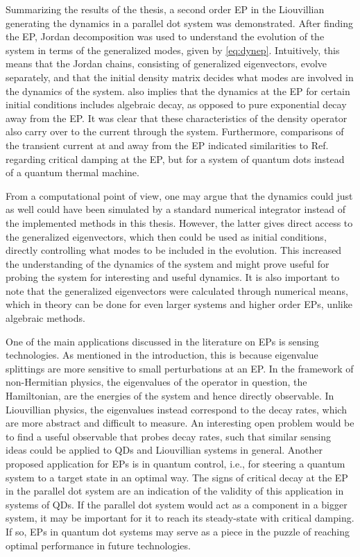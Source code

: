 \documentclass[../main.tex]{subfiles}
\begin{document}
Summarizing the results of the thesis, a second order EP in the Liouvillian generating the dynamics in a parallel dot system was demonstrated. After finding the EP, Jordan decomposition was used to understand the evolution of the system in terms of the generalized modes, given by \cref{eq:dynep}. Intuitively, this means that the Jordan chains, consisting of generalized eigenvectors, evolve separately, and that the initial density matrix decides what modes are involved in the dynamics of the system.  also implies that the dynamics at the EP for certain initial conditions includes algebraic decay, as opposed to pure exponential decay away from the EP. It was clear that these characteristics of the density operator also carry over to the current through the system. Furthermore, comparisons of the transient current at and away from the EP indicated similarities to Ref.~\cite{thermal} regarding critical damping at the EP, but for a system of quantum dots instead of a quantum thermal machine.

From a computational point of view, one may argue that the dynamics could just as well could have been simulated by a standard numerical integrator instead of the implemented methods in this thesis. However, the latter gives direct access to the generalized eigenvectors, which then could be used as initial conditions, directly controlling what modes to be included in the evolution. This increased the understanding of the dynamics of the system and might prove useful for probing the system for interesting and useful dynamics. It is also important to note that the generalized eigenvectors were calculated through numerical means, which in theory can be done for even larger systems and higher order EPs, unlike algebraic methods. %

One of the main applications discussed in the literature on EPs is sensing technologies. As mentioned in the introduction, this is because eigenvalue splittings are more sensitive to small perturbations at an EP. In the framework of non-Hermitian physics, the eigenvalues of the operator in question, the Hamiltonian, are the energies of the system and hence directly observable. In Liouvillian physics, the eigenvalues instead correspond to the decay rates, which are more abstract and difficult to measure. An interesting open problem would be to find a useful observable that probes decay rates, such that similar sensing ideas could be applied to QDs and Liouvillian systems in general. Another proposed application for EPs is in quantum control, i.e., for steering a quantum system to a target state in an optimal way. The signs of critical decay at the EP in the parallel dot system are an indication of the validity of this application in systems of QDs. If the parallel dot system would act as a component in a bigger system, it may be important for it to reach its steady-state with critical damping. If so, EPs in quantum dot systems may serve as a piece in the puzzle of reaching optimal performance in future technologies.
\end{document}
